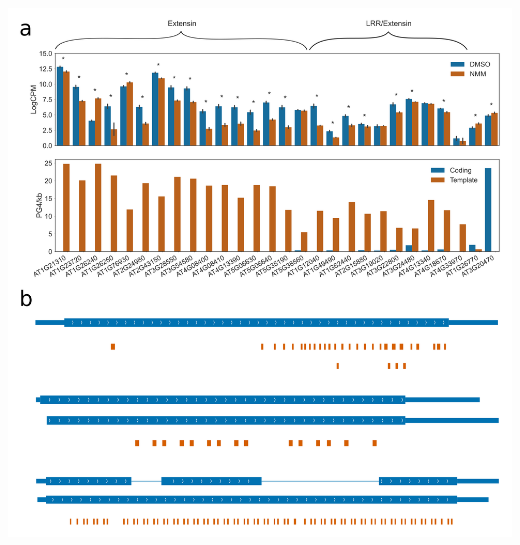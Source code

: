 \documentclass[12pt,a4paper,]{report}
\let\origfigure=\figure
\let\endorigfigure=\endfigure
\renewenvironment{figure}[1][2] {
    \expandafter\origfigure\expandafter[H]
} {
    \endorigfigure
}
\begin{document}
\begin{figure}[htbp]
\centering
\includegraphics[width=\textwidth,height=562pt,keepaspectratio]{chapter_6/figures/extensin_gene_ontology_group_expression_g4s.png}
\caption[Expression and PG4 density of genes in the Cell Wall Structural Ontology group \texttt{GO:0005199}]{\textbf{Expression   and   PG4   density   of   genes   in   the   Cell   Wall   Structural   Ontology   group   \texttt{GO:0005199}}   \textbf{a)}   Panels   showing   gene   expression   (top   panel)   and   PG4   density   (bottom   panel)   for   genes   in   the   \texttt{GO:0005199}   group.   Expression   in   DMSO   (blue)   and   NMM   (orange)   conditions   is   shown   at   log2   counts   per   million   (from   root   RNAseq   dataset).   Errorbars   are   standard   deviation   of   three   biological   replicates.   Genes   which   are   differentially   expressed   with   FDR   <   0.05   are   labelled   with   asterisks.   In   PG4   panel,   the   exonic   PG4   density   per   kilobase   is   shown   separately   for   coding   (blue)   and   template   (orange)   strands   of   the   gene.   \textbf{b)}   Gene   tracks   showing   the   location   of   predicted   two   tetrad   PG4s   in   orange   for   (from   top   to   bottom)   LRX1,   EXT13,   and   EXT9.   Gene   models   from   Araport11   are   shown   in   blue.   In   gene   models,   thin   boxes   represent   untranslated   regions   (UTRs),   fat   boxes   represent   coding   regions   (CDS),   and   connecting   lines   represent   intronic   regions.   \label{ext_genes}}

\end{figure}
\end{document}
